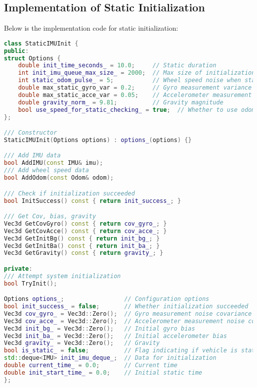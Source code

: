 \subsection{Implementation of Static Initialization}
Below is the implementation code for static initialization:

\begin{lstlisting}[language=c++,caption=src/ch3/static\_imu\_init.cc]
class StaticIMUInit {
public:
struct Options {
	double init_time_seconds_ = 10.0;     // Static duration
	int init_imu_queue_max_size_ = 2000;  // Max size of initialization IMU queue
	int static_odom_pulse_ = 5;           // Wheel speed noise when static
	double max_static_gyro_var = 0.2;     // Gyro measurement variance when static
	double max_static_acce_var = 0.05;    // Accelerometer measurement variance when static
	double gravity_norm_ = 9.81;          // Gravity magnitude
	bool use_speed_for_static_checking_ = true;  // Whether to use odom for static checking (some datasets don't have odom)
};

/// Constructor
StaticIMUInit(Options options) : options_(options) {}

/// Add IMU data
bool AddIMU(const IMU& imu);
/// Add wheel speed data
bool AddOdom(const Odom& odom);

/// Check if initialization succeeded
bool InitSuccess() const { return init_success_; }

/// Get Cov, bias, gravity
Vec3d GetCovGyro() const { return cov_gyro_; }
Vec3d GetCovAcce() const { return cov_acce_; }
Vec3d GetInitBg() const { return init_bg_; }
Vec3d GetInitBa() const { return init_ba_; }
Vec3d GetGravity() const { return gravity_; }

private:
/// Attempt system initialization
bool TryInit();

Options options_;                 // Configuration options
bool init_success_ = false;       // Whether initialization succeeded
Vec3d cov_gyro_ = Vec3d::Zero();  // Gyro measurement noise covariance (evaluated during init)
Vec3d cov_acce_ = Vec3d::Zero();  // Accelerometer measurement noise covariance (evaluated during init)
Vec3d init_bg_ = Vec3d::Zero();   // Initial gyro bias
Vec3d init_ba_ = Vec3d::Zero();   // Initial accelerometer bias
Vec3d gravity_ = Vec3d::Zero();   // Gravity
bool is_static_ = false;          // Flag indicating if vehicle is static
std::deque<IMU> init_imu_deque_;  // Data for initialization
double current_time_ = 0.0;       // Current time
double init_start_time_ = 0.0;    // Initial static time
};


\end{lstlisting}
